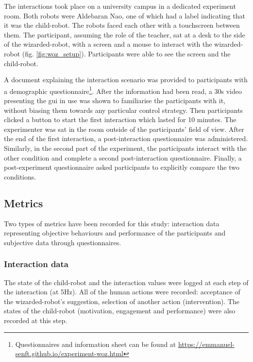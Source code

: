 The interactions took place on a university campus in a dedicated experiment room. Both robots were Aldebaran Nao, one of which had a label indicating that it was the child-robot. The robots faced each other with a touchscreen between them. The participant, assuming the role of the teacher, sat at a desk to the side of the wizarded-robot, with a screen and a mouse to interact with the wizarded-robot (fig. \ref{fig:woz_setup}). Participants were able to see the screen and the child-robot.

A document explaining the interaction scenario was provided to participants with a demographic questionnaire\footnote{Questionnaires and information sheet can be found at \url{https://emmanuel-senft.github.io/experiment-woz.html}}. After the information had been read, a 30s video presenting the \gls{gui} in use was shown to familiarise the participants with it, without biasing them towards any particular control strategy. Then participants clicked a button to start the first interaction which lasted for 10 minutes. The experimenter was sat in the room outside of the participants' field of view. After the end of the first interaction, a post-interaction questionnaire was administered. Similarly, in the second part of the experiment, the participants interact with the other condition and complete a second post-interaction questionnaire. Finally, a post-experiment questionnaire asked participants to explicitly compare the two conditions.

\subsection{Metrics}

Two types of metrics have been recorded for this study: interaction data representing objective behaviours and performance of the participants and subjective data through questionnaires.

\subsubsection{Interaction data}

The state of the child-robot and the interaction values were logged at each step of the interaction (at 5Hz). All of the human actions were recorded: acceptance of the wizarded-robot's suggestion, selection of another action (intervention). The states of the child-robot (motivation, engagement and performance) were also recorded at this step. 

